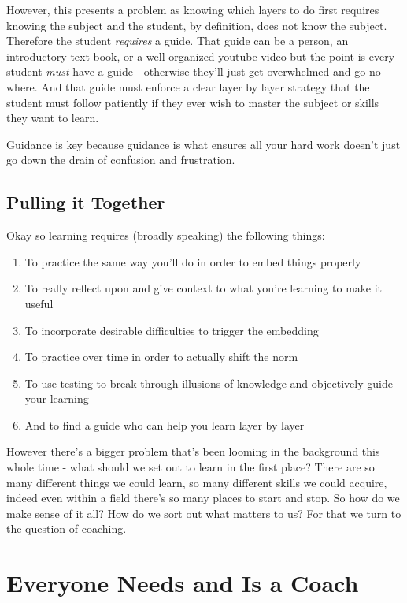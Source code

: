 \documentclass[11pt,a5paper]{book}
\begin{document}
However, this presents a problem as knowing which layers to do first requires knowing the subject and the student, by definition, does not know the subject. Therefore the student \textit{requires} a guide. That guide can be a person, an introductory text book, or a well organized youtube video but the point is every student \textit{must} have a guide - otherwise they'll just get overwhelmed and go no-where. And that guide must enforce a clear layer by layer strategy that the student must follow patiently if they ever wish to master the subject or skills they want to learn. 
\newline

Guidance is key because guidance is what ensures all your hard work doesn't just go down the drain of confusion and frustration.

\subsection{Pulling it Together}
Okay so learning requires (broadly speaking) the following things:

\begin{enumerate}
\item To practice the same way you'll do in order to embed things properly
\item To really reflect upon and give context to what you're learning to make it useful
\item To incorporate desirable difficulties to trigger the embedding
\item To practice over time in order to actually shift the norm
\item To use testing to break through illusions of knowledge and objectively guide your learning
\item And to find a guide who can help you learn layer by layer
\end{enumerate}

However there's a bigger problem that's been looming in the background this whole time - what should we set out to learn in the first place? There are so many different things we could learn, so many different skills we could acquire, indeed even within a field there's so many places to start and stop. So how do we make sense of it all? How do we sort out what matters to us? For that we turn to the question of coaching.

\section{Everyone Needs and Is a Coach}




\end{document}
